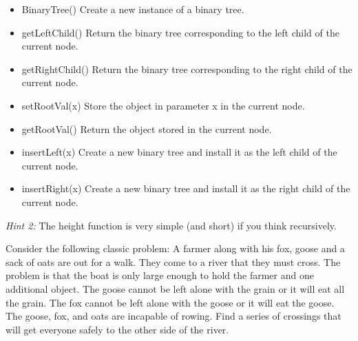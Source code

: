 \documentclass[11pt]{exam}
\begin{document}
\begin{questions}
\begin{itemize}
	\item BinaryTree()  Create a new instance of a binary tree.
    \item getLeftChild() Return the binary tree corresponding to the left child of the current node.
    \item getRightChild() Return the binary tree corresponding to the right child of the current node.
    \item setRootVal(x) Store the object in parameter x in the current node.
    \item getRootVal() Return the object stored in the current node.
    \item insertLeft(x) Create a new binary tree and install it as the left child of the current node.
    \item insertRight(x) Create a new binary tree and install it as the right child of the current node.

\end{itemize}

\textit{Hint 2:} The height function is very simple (and short) if you think recursively.

\newpage
\question  Consider the following classic problem:  A farmer along with his fox, goose and a sack of oats are out for a walk.  They come to a river that they must cross.  The problem is that the boat is only large enough to hold the farmer and one additional object.  The goose cannot be left alone with the grain or it will eat all the grain.  The fox cannot be left alone with the goose or it will eat the goose.  The goose, fox, and oats are incapable of rowing.  Find a series  of crossings that will get everyone safely to the other side of the river.

\vspace{8in}


\end{questions}
\end{document}
